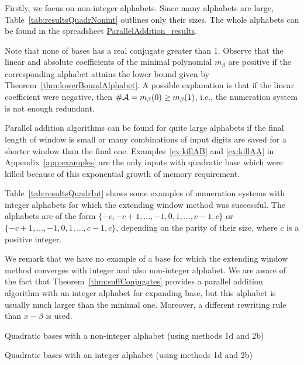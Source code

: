 Firstly, we focus on non-integer alphabets. Since many alphabets are large, Table~\ref{tab:resultsQuadrNonint} outlines only their sizes. The whole alphabets can be found in the spreadsheet \href{https://docs.google.com/spreadsheets/d/1TnhrHdefHfHa0WSeVs4q6XVj3epjPlPlnoekE0E1xeM/edit?usp=sharing}{ParallelAddition\_results}.

Note that none of bases has a real conjugate greater than 1. Observe that the linear and absolute coefficients of the minimal polynomial $m_\beta$ are positive if the corresponding alphabet attains the lower bound given by Theorem~\ref{thm:lowerBoundAlphabet}. A possible explanation is that if the linear coefficient were negative, then $\#\mathcal{A}=m_\beta(0)\geq m_\beta(1)$, i.e., the numeration system is not enough redundant.

Parallel addition algorithms can be found for quite large alphabets  if the final length of window is small or many combinations of input digits  are saved for a shorter window than the final one. Examples~\ref{ex:killAB} and \ref{ex:killAA} in Appendix~\ref{app:examples} are the only inputs with quadratic base which were killed because of this exponential growth of memory requirement.

Table~\ref{tab:resultsQuadrInt} shows some examples of numeration systems with integer alphabets for which the extending window method was successful. The alphabets are of the form $\{-c, -c+1, \dots, -1,0,1,\dots, c-1,c\}$ or $\{-c+1, \dots, -1,0,1,\dots, c-1,c\}$, depending on the parity of their size, where $c$ is a positive integer.

We remark that we have no example of a base for which the extending window method converges with integer and also non-integer alphabet. We are aware of the fact that Theorem~\ref{thm:suffConjugates} provides a parallel addition algorithm with an integer alphabet for expanding base, but this alphabet is usually much larger than the minimal one. Moreover, a different rewriting rule than $x-\beta$ is used.

\begin{table}[h]
	\begin{center}
	
	\end{center}
\caption{Quadratic bases with a non-integer alphabet (using methods 1d and 2b)}
\label{tab:resultsQuadrNonint}
\end{table}

 
\begin{table}[h]
	\begin{center}
	
	\end{center}
\caption{Quadratic bases with an integer alphabet (using methods 1d and 2b)}
\label{tab:resultsQuadrInt}
\end{table}


